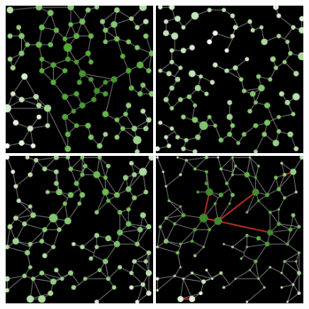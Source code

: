 \begin{figure}
	\centering
	\includegraphics[width=0.49\textwidth]{figures/setup_stylized.png}\hspace{0.1cm}
	\includegraphics[width=0.49\textwidth]{figures/setup_synth_0.png}\\\vspace{0.1cm}
	\includegraphics[width=0.49\textwidth]{figures/setup_synth_1.png}\hspace{0.1cm}
	\includegraphics[width=0.49\textwidth]{figures/setup_synth_1_tick100.png}

\end{figure}
